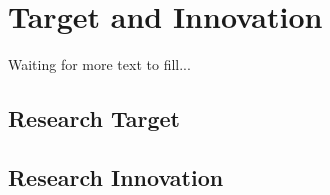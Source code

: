 \section{Target and Innovation}

Waiting for more text to fill...
\subsection{Research Target}
\subsection{Research Innovation}